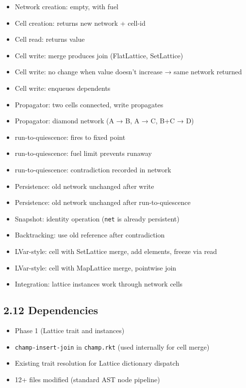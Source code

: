 \documentclass[11pt]{article}
\begin{document}
\begin{itemize}
\item Network creation: empty, with fuel
\item Cell creation: returns new network + cell-id
\item Cell read: returns value
\item Cell write: merge produces join (FlatLattice, SetLattice)
\item Cell write: no change when value doesn't increase → same network returned
\item Cell write: enqueues dependents
\item Propagator: two cells connected, write propagates
\item Propagator: diamond network (A → B, A → C, B+C → D)
\item run-to-quiescence: fires to fixed point
\item run-to-quiescence: fuel limit prevents runaway
\item run-to-quiescence: contradiction recorded in network
\item Persistence: old network unchanged after write
\item Persistence: old network unchanged after run-to-quiescence
\item Snapshot: identity operation (\texttt{net} is already persistent)
\item Backtracking: use old reference after contradiction
\item LVar-style: cell with SetLattice merge, add elements, freeze via read
\item LVar-style: cell with MapLattice merge, pointwise join
\item Integration: lattice instances work through network cells
\end{itemize}
\subsection{2.12 Dependencies}
\label{sec:org124c7c7}

\begin{itemize}
\item Phase 1 (Lattice trait and instances)
\item \texttt{champ-insert-join} in \texttt{champ.rkt} (used internally for cell merge)
\item Existing trait resolution for Lattice dictionary dispatch
\item 12+ files modified (standard AST node pipeline)
\end{itemize}
\end{document}
